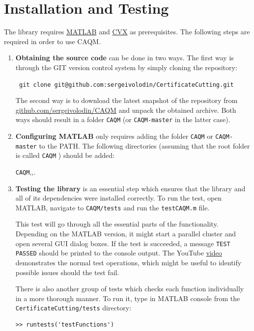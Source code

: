 \documentclass[a4paper]{article}
\theoremstyle{definition}
\begin{document}
\section*{Installation and Testing}
The library requires \href{https://www.mathworks.com/downloads/}{MATLAB} and \href{http://cvxr.com/cvx/download/}{CVX} as prerequisites. The following steps are required in order to use CAQM.
\begin{enumerate}
\item {\bf Obtaining the source code} can be done in two ways. The first way is through the GIT version control system by simply cloning the repository:
\begin{center}\tt
git clone git@github.com:sergeivolodin/CertificateCutting.git
\end{center}
The second way is to download the latest snapshot of the repository from \href{https://github.com/sergeivolodin/CAQM}{github.com/sergeivolodin/CAQM} and unpack the obtained archive. 
Both ways should result in a folder {\tt CAQM} (or {\tt CAQM-master} in the latter case). 

\item {\bf Configuring MATLAB} only requires adding the folder {\tt CAQM} or {\tt CAQM-master} to the PATH. The following directories (assuming that the root folder is called  {\tt CAQM} ) should be added: 

\begin{center}
 {\tt CAQM},,.
\end{center}

\item {\bf Testing the library} is an essential step which ensures that the library and all of its dependencies were installed correctly. To run the test, open MATLAB, navigate to 
{\tt CAQM/tests} and run the {\tt testCAQM.m} file.

This test will go through all the essential parts of the functionality. Depending on the MATLAB version, it might start a parallel cluster and open several GUI dialog boxes. If the test is succeeded, a message {\tt TEST PASSED} should be printed to the console output. The YouTube \href{https://youtu.be/Ikh_GDHnu-4}{video} demonstrates the normal test operations, which  might be useful to identify possible issues should the test fail. 

There is also another group of tests which checks each function individually in a more thorough manner. To run it, type in MATLAB console from the {\tt CertificateCutting/tests} directory:
\begin{verbatim}
>> runtests('testFunctions')
\end{verbatim}
\end{enumerate}
\end{document}
